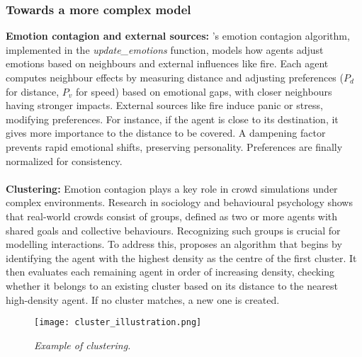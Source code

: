 \documentclass[12pt]{article}
\begin{document}
\begin{spacing}{1.15}
\begin{multicols}{2}
\subsubsection{Towards a more complex model}
\textbf{Emotion contagion and external sources:}
\cite{emotionContagion}'s emotion contagion algorithm, implemented in the \textit{update\_emotions} function, models how agents adjust emotions based on neighbours and external influences like fire. Each agent computes neighbour effects by measuring distance and adjusting preferences ($P_d$ for distance, $P_v$ for speed) based on emotional gaps, with closer neighbours having stronger impacts. External sources like fire induce panic or stress, modifying preferences. For instance, if the agent is close to its destination, it gives more importance to the distance to be covered. A dampening factor prevents rapid emotional shifts, preserving personality. Preferences are finally normalized for consistency. \\
\\
\textbf{Clustering:}
Emotion contagion plays a key role in crowd simulations under complex environments. Research in sociology and behavioural psychology shows that real-world crowds consist of groups, defined as two or more agents with shared goals and collective behaviours. Recognizing such groups is crucial for modelling interactions. To address this, \cite{emotionContagion} proposes an algorithm that begins by identifying the agent with the highest density as the centre of the first cluster. It then evaluates each remaining agent in order of increasing density, checking whether it belongs to an existing cluster based on its distance to the nearest high-density agent. If no cluster matches, a new one is created.
\begin{figure}[H]
\centering
\texttt{[image: cluster\_illustration.png]}
\caption{\textit{Example of clustering.}}
\end{figure}


\end{multicols}
\end{spacing}
\end{document}
